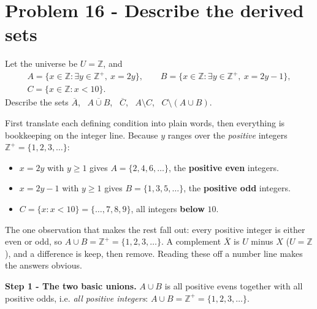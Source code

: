 \documentclass[11pt,a4paper]{article}
\newcommand{\Z}{\mathbb{Z}}
\begin{document}
\section*{Problem 16 - Describe the derived sets}

\begin{problembox}[16]
Let the universe be $U=\Z$, and
\begin{gather*}
A=\{x\in\Z:\exists y\in\Z^{+},\ x=2y\},\qquad
  B=\{x\in\Z:\exists y\in\Z^{+},\ x=2y-1\},\\
  C=\{x\in\Z:x<10\}.
\end{gather*}
Describe the sets $\overline{A}$, \ $\overline{A\cup B}$, \ $\overline{C}$, \ $A\setminus C$, \
$C\setminus(A\cup B)$.
\end{problembox}

\begin{ideabox}
First translate each defining condition into plain words, then everything is bookkeeping on the
integer line. Because $y$ ranges over the \emph{positive} integers $\Z^{+}=\{1,2,3,\dots\}$:
\begin{itemize}[leftmargin=1.2cm,topsep=2pt]
\item $x=2y$ with $y\ge 1$ gives $A=\{2,4,6,\dots\}$, the \textbf{positive even} integers.
\item $x=2y-1$ with $y\ge 1$ gives $B=\{1,3,5,\dots\}$, the \textbf{positive odd} integers.
\item $C=\{x:x<10\}=\{\dots,7,8,9\}$, all integers \textbf{below} $10$.
\end{itemize}
The one observation that makes the rest fall out: every positive integer is either even or odd, so
$A\cup B=\Z^{+}=\{1,2,3,\dots\}$. A complement $\overline{X}$ is \textquotedbl{}$U$ minus
$X$\textquotedbl{} ($U=\Z$), and a difference is \textquotedbl{}keep, then remove\textquotedbl{}.
Reading these off a number line makes the answers obvious.
\end{ideabox}

\textbf{Step 1 - The two basic unions.}
$A\cup B$ is all positive evens together with all positive odds, i.e. \emph{all positive
integers}: $A\cup B=\Z^{+}=\{1,2,3,\dots\}$.
\end{document}
